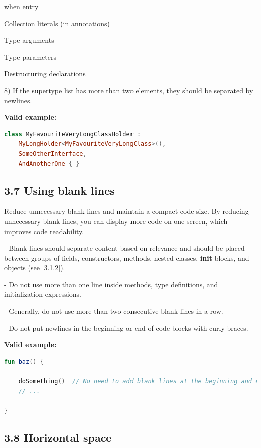 when entry

Collection literals (in annotations)

Type arguments

Type parameters

Destructuring declarations



8) If the supertype list has more than two elements, they should be separated by newlines.



\textbf{Valid example:} 

\begin{lstlisting}[language=Kotlin]
class MyFavouriteVeryLongClassHolder :
    MyLongHolder<MyFavouriteVeryLongClass>(),
    SomeOtherInterface,
    AndAnotherOne { }
\end{lstlisting}


\subsection*{\textbf{3.7 Using blank lines}}

\label{sec:3.7}



Reduce unnecessary blank lines and maintain a compact code size. By reducing unnecessary blank lines, you can display more code on one screen, which improves code readability.

- Blank lines should separate content based on relevance and should be placed between groups of fields, constructors, methods, nested classes, \textbf{init} blocks, and objects (see [3.1.2]).

- Do not use more than one line inside methods, type definitions, and initialization expressions.

- Generally, do not use more than two consecutive blank lines in a row.

- Do not put newlines in the beginning or end of code blocks with curly braces.



\textbf{Valid example:}

\begin{lstlisting}[language=Kotlin]
fun baz() {
        
    doSomething()  // No need to add blank lines at the beginning and end of the code block
    // ...

}
\end{lstlisting}


\subsection*{\textbf{3.8 Horizontal space}}

